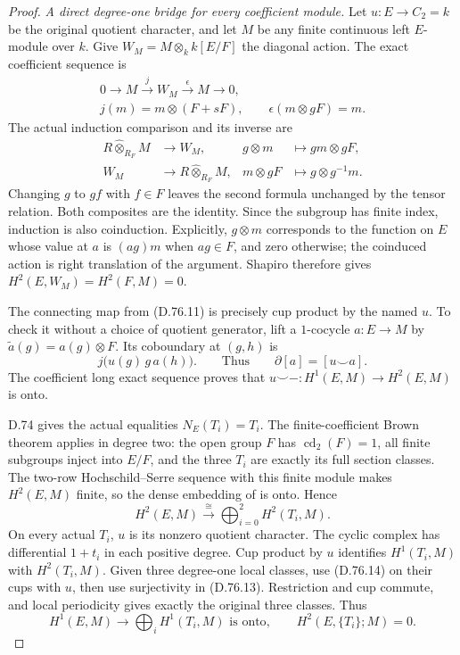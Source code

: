\begin{proof}
\emph{A direct degree-one bridge for every coefficient module.}
Let $u:E\to C_2=k$ be the original quotient character,
and let $M$ be any finite continuous left $E$-module
over $k$. Give
$W_M=M\otimes_k k[E/F]$ the diagonal action.
The exact coefficient sequence is
\[
 \begin{gathered}
 0\longrightarrow M\xrightarrow{\ j\ }W_M
                    \xrightarrow{\ \epsilon\ }M
                       \longrightarrow0,\\
 j(m)=m\otimes(F+sF),\qquad
 \epsilon(m\otimes gF)=m.
 \end{gathered}                                               \tag{D.76.11}
\]
The actual induction comparison and its inverse are
\[
 \begin{aligned}
 R\widehat\otimes_{R_F}M&\longrightarrow W_M,
              &g\otimes m&\longmapsto gm\otimes gF,\\
 W_M&\longrightarrow R\widehat\otimes_{R_F}M,
              &m\otimes gF&\longmapsto g\otimes g^{-1}m .
 \end{aligned}                                                \tag{D.76.12}
\]
Changing $g$ to $gf$ with $f\in F$ leaves the second
formula unchanged by the tensor relation. Both composites
are the identity. Since the subgroup has finite index,
induction is also coinduction. Explicitly, $g\otimes m$
corresponds to the function on $E$ whose value at $a$ is
$(ag)m$ when $ag\in F$, and zero otherwise; the coinduced
action is right translation of the argument.
Shapiro therefore gives
$H^2(E,W_M)=H^2(F,M)=0$.

The connecting map from (D.76.11) is precisely
cup product by the named $u$. To check it without a
choice of quotient generator, lift a $1$-cocycle
$a:E\to M$ by $\widetilde a(g)=a(g)\otimes F$.
Its coboundary at $(g,h)$ is
\[
 j\bigl(u(g)\,g\,a(h)\bigr).
 \qquad\text{Thus}\qquad
 \partial[a]=[u\smile a].
                                                               \tag{D.76.13}
\]
The coefficient long exact sequence proves that
$u\smile-:H^1(E,M)\to H^2(E,M)$ is onto.

D.74 gives the actual equalities $N_E(T_i)=T_i$.
The finite-coefficient Brown theorem applies in degree
two: the open group $F$ has $\operatorname{cd}_2(F)=1$,
all finite subgroups inject into $E/F$, and the three
$T_i$ are exactly its full section classes.
The two-row Hochschild--Serre sequence with this finite
module makes $H^2(E,M)$ finite, so the dense embedding of
\cite[Theorem~2 and Section~1.1]{A-KochloukovaZalesskii2007}
is onto. Hence
\[
       H^2(E,M)\xrightarrow{\ \cong\ }
                            \bigoplus_{i=0}^2H^2(T_i,M).
                                                               \tag{D.76.14}
\]
On every actual $T_i$, $u$ is its nonzero quotient
character. The cyclic complex has differential $1+t_i$
in each positive degree. Cup product by $u$ identifies
$H^1(T_i,M)$ with $H^2(T_i,M)$.
Given three degree-one local classes, use (D.76.14)
on their cups with $u$, then use surjectivity in
(D.76.13). Restriction and cup commute, and local
periodicity gives exactly the original three classes.
Thus
\[
 H^1(E,M)\longrightarrow\bigoplus_iH^1(T_i,M)
       \text{ is onto},\qquad
 H^2(E,\{T_i\};M)=0.                                        \tag{D.76.15}
\]


\end{proof}

